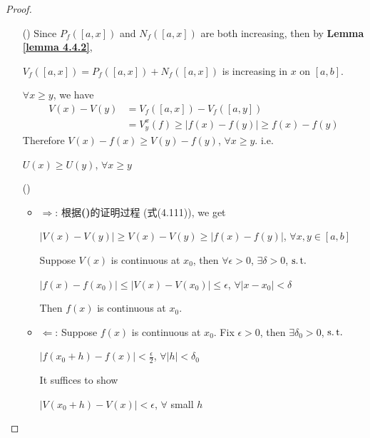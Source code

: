 \begin{proposition}
\begin{proof}
\begin{enumerate}
				\newpage
				
				\item[(\rmnum{2})] Since $P_{f}([a , x])$ and $N_{f}([a , x])$ are both increasing, then by \textbf{Lemma \ref{lemma 4.4.2}},
				\begin{center}
					$V_{f}([a , x]) = P_{f}([a , x]) + N_{f}([a , x])$ is increasing in $x$ on $[a , b]$.
				\end{center}
				$\forall x \geq y$, we have
				\begin{align}
					V(x) - V(y) 
					&= V_{f}([a , x]) - V_{f}([a , y]) \\
					&= V_{y}^{x}(f) 
					\geq \left| f(x) - f(y) \right| 
					\geq f(x) - f(y)
				\end{align}
				Therefore $V(x) - f(x) \geq V(y) - f(y)$, $\forall x \geq y$. i.e.
				\begin{center}
					$U(x) \geq U(y)$, $\forall x \geq y$
				\end{center}
			
				\vspace{4em}
				
				\item[(\rmnum{3})] 
				\begin{itemize}
					\item $\Rightarrow$: 根据\textbf{()}的证明过程 (式(4.111)), we get
					\begin{center}
						$\left| V(x) - V(y) \right| \geq V(x) - V(y) \geq \left| f(x) - f(y) \right|$, $\forall x , y \in [a , b]$
					\end{center}
					Suppose $V(x)$ is continuous at $x_0$, then $\forall \epsilon > 0$, $\exists \delta > 0$, $\operatorname{s.t.}$
					\begin{center}
						$\left| f(x) - f(x_0) \right| \leq \left| V(x) - V(x_0) \right| \leq \epsilon$, $\forall \left| x - x_0 \right| < \delta$
					\end{center}
					Then $f(x)$ is continuous at $x_0$.
					
					\vspace{2em}
					
					\item $\Leftarrow$: Suppose $f(x)$ is continuous at $x_0$. Fix $\epsilon > 0$, then $\exists \delta_0 > 0$, $\operatorname{s.t.}$
					\begin{center}
						$\left| f(x_0 + h) - f(x) \right| < \frac{\epsilon}{2}$, $\forall \left| h \right| < \delta_0$
					\end{center}
					It suffices to show
					\begin{center}
						$\left| V(x_0 + h) - V(x) \right| < \epsilon$, $\forall$ small $h$
					\end{center}
					

\end{itemize}
\end{enumerate}
\end{proof}
\end{proposition}
